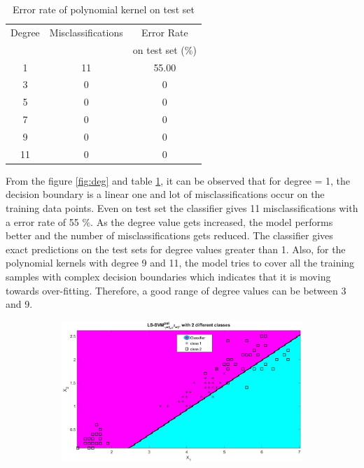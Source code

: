 \documentclass[12pt]{report}
\begin{document}
{\begin{table}
	\caption{Error rate of polynomial kernel on test set}\label{table:1}
	\begin{tabular}{|c|c|c|}
		\hline
		Degree & Misclassifications & Error Rate \\
		&&on test set (\%)\\ \hline
		1 &11 & 55.00 \\ \hline
		3 &0 & 0 \\  \hline
		5 &0 & 0 \\  \hline
		7 &0 & 0 \\  \hline
		9 &0 & 0 \\  \hline
		11 &0 & 0 \\ \hline
	\end{tabular}
\end{table}
 From the figure \ref{fig:deg} and table \ref{table:1}, it can be observed that for degree = 1, the decision boundary is a linear one and lot of misclassifications occur on the training data points. Even on test set the classifier gives 11 misclassifications with a error rate of 55 \%. As the degree value gets increased, the model performs better and the number of misclassifications gets reduced. The classifier gives exact predictions on the test sets for degree values greater than 1. Also, for the polynomial kernels with degree 9 and 11, the model tries to cover all the training samples with complex decision boundaries which indicates that it is moving towards over-fitting. Therefore, a good range of degree values can be between 3 and 9.\\
 \begin{figure}[!htbp] 
 	\centering
 	\begin{subfigure}{.33\textwidth}
 		\centering
 		\includegraphics[height=0.8\linewidth,width=1\linewidth]{Ex1.3_deg(1).jpg}

\end{subfigure}
\end{figure}}
\end{document}
